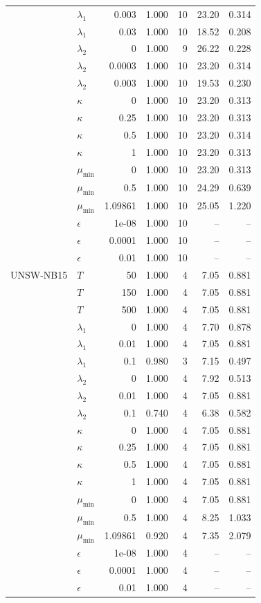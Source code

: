 \begin{table}[t]
\begin{tabular}{@{}llrrrrr@{}}
 & $\lambda_1$ & 0.003 & 1.000 & 10 & 23.20 & 0.314 \\
 & $\lambda_1$ & 0.03 & 1.000 & 10 & 18.52 & 0.208 \\
 & $\lambda_2$ & 0 & 1.000 & 9 & 26.22 & 0.228 \\
 & $\lambda_2$ & 0.0003 & 1.000 & 10 & 23.20 & 0.314 \\
 & $\lambda_2$ & 0.003 & 1.000 & 10 & 19.53 & 0.230 \\
 & $\kappa$ & 0 & 1.000 & 10 & 23.20 & 0.313 \\
 & $\kappa$ & 0.25 & 1.000 & 10 & 23.20 & 0.313 \\
 & $\kappa$ & 0.5 & 1.000 & 10 & 23.20 & 0.314 \\
 & $\kappa$ & 1 & 1.000 & 10 & 23.20 & 0.313 \\
 & $\mu_{\min}$ & 0 & 1.000 & 10 & 23.20 & 0.313 \\
 & $\mu_{\min}$ & 0.5 & 1.000 & 10 & 24.29 & 0.639 \\
 & $\mu_{\min}$ & 1.09861 & 1.000 & 10 & 25.05 & 1.220 \\
 & $\epsilon$ & 1e-08 & 1.000 & 10 & -- & -- \\
 & $\epsilon$ & 0.0001 & 1.000 & 10 & -- & -- \\
 & $\epsilon$ & 0.01 & 1.000 & 10 & -- & -- \\
\midrule
UNSW-NB15 & $T$ & 50 & 1.000 & 4 & 7.05 & 0.881 \\
 & $T$ & 150 & 1.000 & 4 & 7.05 & 0.881 \\
 & $T$ & 500 & 1.000 & 4 & 7.05 & 0.881 \\
 & $\lambda_1$ & 0 & 1.000 & 4 & 7.70 & 0.878 \\
 & $\lambda_1$ & 0.01 & 1.000 & 4 & 7.05 & 0.881 \\
 & $\lambda_1$ & 0.1 & 0.980 & 3 & 7.15 & 0.497 \\
 & $\lambda_2$ & 0 & 1.000 & 4 & 7.92 & 0.513 \\
 & $\lambda_2$ & 0.01 & 1.000 & 4 & 7.05 & 0.881 \\
 & $\lambda_2$ & 0.1 & 0.740 & 4 & 6.38 & 0.582 \\
 & $\kappa$ & 0 & 1.000 & 4 & 7.05 & 0.881 \\
 & $\kappa$ & 0.25 & 1.000 & 4 & 7.05 & 0.881 \\
 & $\kappa$ & 0.5 & 1.000 & 4 & 7.05 & 0.881 \\
 & $\kappa$ & 1 & 1.000 & 4 & 7.05 & 0.881 \\
 & $\mu_{\min}$ & 0 & 1.000 & 4 & 7.05 & 0.881 \\
 & $\mu_{\min}$ & 0.5 & 1.000 & 4 & 8.25 & 1.033 \\
 & $\mu_{\min}$ & 1.09861 & 0.920 & 4 & 7.35 & 2.079 \\
 & $\epsilon$ & 1e-08 & 1.000 & 4 & -- & -- \\
 & $\epsilon$ & 0.0001 & 1.000 & 4 & -- & -- \\
 & $\epsilon$ & 0.01 & 1.000 & 4 & -- & -- \\
\bottomrule
\end{tabular}
\end{table}
